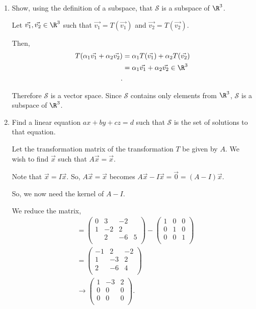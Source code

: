 \documentclass{article}
\begin{document}
\begin{enumerate}[label=(\alph*)]
  \item Show, using the definition of a subspace, that $\mathcal{S}$ is a subspace of $\R^{3}$. 

    Let $\vec{v_1},\vec{v_2}\in \R^{3}$ such that $\vec{v_1}=T(\vec{v_1})$ and $\vec{v_2}=T(\vec{v_2})$.

    Then,
    \begin{align*}
      T(\alpha_1\vec{v_1}+\alpha_2\vec{v_2})&= \alpha_1 T(\vec{v_1})+\alpha_2 T(\vec{v_2}) \\
      &= \alpha_1\vec{v_1}+\alpha_2\vec{v_2} \in \R^{3} \\
    .\end{align*}

    Therefore $\mathcal{S}$ is a vector space. Since $\mathcal{S}$ contains only elements from $\R^{3}$, $\mathcal{S}$ is a subspace of $\R^{3}$.

  \item Find a linear equation $ax+by+cz=d$ such that $\mathcal{S}$ is the set of solutions to that equation.

    Let the transformation matrix of the transformation $T$ be given by $A$. We wish to find $\vec{x}$ such that $A\vec{x}=\vec{x}$.

  Note that $\vec{x}=I \vec{x}$. So, $A\vec{x}=\vec{x}$ becomes $A\vec{x}-I\vec{x}=\vec{0}=(A-I)\vec{x}$.

  So, we now need the kernel of $A-I$.

  We reduce the matrix,
   \begin{align*}
     &= \begin{pmatrix} 0&3&-2\\1&-2&2\\&2&-6&5\\ \end{pmatrix} - \begin{pmatrix} 1&0&0\\0&1&0\\0&0&1\\ \end{pmatrix} \\
     &= \begin{pmatrix} -1&2&-2\\1&-3&2\\2&-6&4\\ \end{pmatrix}  \\
     &\rightarrow \begin{pmatrix} 1&-3&2\\0&0&0\\0&0&0\\ \end{pmatrix}.
  \end{align*}


\end{enumerate}
\end{document}
